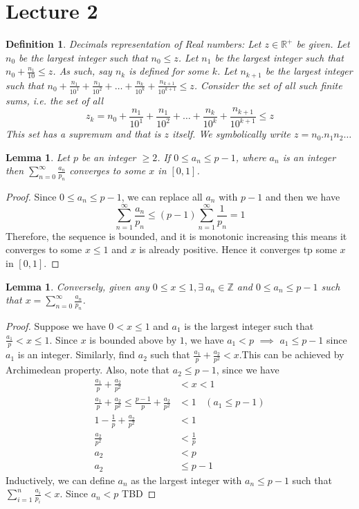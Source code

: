 \documentclass[12pt]{report}
\newtheorem{lem}[thm]{Lemma}
\newtheorem{defn}{Definition}
\begin{document}
\section*{Lecture 2}
\begin{defn}
    Decimals representation of Real numbers: Let $z \in \mathbb{R}^+$ be given. Let $n_0$ be the largest integer such that $n_0 \leq z$. Let $n_1$ be the largest integer such that $n_0 + \frac{n_1}{10} \leq z$. As such, say $n_k$ is defined for some $k$. Let $n_{k+1}$ be the largest integer such that $n_0 + \frac{n_1}{10^1} + \frac{n_1}{10^2} + \dots + \frac{n_k}{10^k}+\frac{n_{k+1}}{10^{k+1}} \leq z$. Consider the set of all such finite sums, i.e. the set of all
    $$ z_k = n_0 + \frac{n_1}{10^1} + \frac{n_1}{10^2} + \dots + \frac{n_k}{10^k}+\frac{n_{k+1}}{10^{k+1}} \leq z$$
    This set has a supremum and that is $z$ itself. We symbolically write $z = n_0.n_1n_2 \dots $
\end{defn}
\begin{lem}
    Let $p$ be an integer $\geq 2$. If $0 \leq a_n \leq p-1$, where $a_n$ is an integer then $\sum\limits_{n=0}^{\infty} \frac{a_n}{p_n}$ converges to some $x$ in $[0,1]$.
\end{lem}
\begin{proof}
    Since $0 \leq a_n \leq p-1$, we can replace all $a_n$ with $p-1$ and then we have$$ \sum\limits_{n=1}^{\infty} \frac{a_n}{p_n} \leq (p-1)\sum\limits_{n=1}^{\infty} \frac{1}{p_n} = 1$$
    Therefore, the sequence is bounded, and it is monotonic increasing this means it converges to some $x \leq 1$ and $x$ is already positive. Hence it converges tp some $x$ in $[0,1]$. 
\end{proof}
\begin{lem}
    Conversely, given any  $ 0 \leq x \leq 1, \exists~ a_n \in \mathbb{Z}$ and $0 \leq  a_n \leq p-1$ such that $x = \sum\limits_{n=0}^{\infty} \frac{a_n}{p_n}$.
\end{lem}
\begin{proof}
    Suppose we have $0 < x \leq 1$ and $a_1$ is the largest integer such that $ \frac{a_1}{p} < x \leq 1$. Since $x$ is bounded above by $1$, we have $ a_1 < p$ $\implies$ $a_1 \leq p-1$ since $a_1$ is an integer. Similarly, find $a_2$ such that $\frac{a_1}{p} + \frac{a_2}{p^2} < x$.This can be achieved by Archimedean property. Also, note that $a_2 \leq p-1$, since we have 
    \begin{align*}
        \frac{a_1}{p} + \frac{a_2}{p^2} &< x < 1\\
        \frac{a_1}{p} + \frac{a_2}{p^2} \leq \frac{p-1}{p} + \frac{a_2}{p^2} &< 1~~~~ (a_1 \leq p-1)\\
        1 - \frac{1}{p} + \frac{a_2}{p^2} &< 1\\
        \frac{a_2}{p^2} &< \frac{1}{p}\\
        a_2 &< p \\
        a_2 &\leq p-1
    \end{align*}
Inductively, we can define $a_n$ as the largest integer with $a_n \leq p-1$ such that $\sum\limits_{i=1}^{n} \frac{a_i}{p_i} < x$. Since $a_n < p$
TBD
\end{proof}
\end{document}
